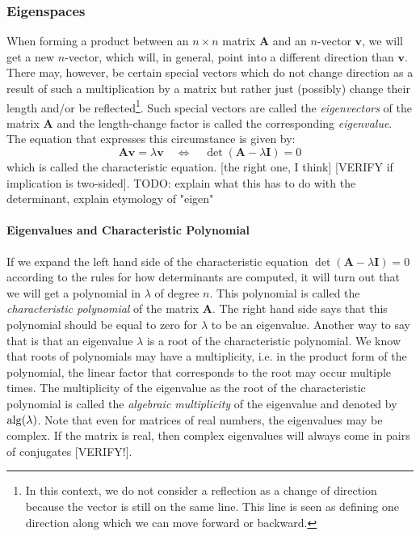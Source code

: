 \subsubsection{Eigenspaces}
When forming a product between an $n \times n$ matrix $\mathbf{A}$ and an $n$-vector $\mathbf{v}$, we will get a new $n$-vector, which will, in general, point into a different direction than  $\mathbf{v}$. There may, however, be certain special vectors which do not change direction as a result of such a multiplication by a matrix but rather just (possibly) change their length and/or be reflected\footnote{In this context, we do not consider a reflection as a change of direction because the vector is still on the same line. This line is seen as defining one direction along which we can move forward or backward.}. Such special vectors are called the \emph{eigenvectors} of the matrix $\mathbf{A}$ and the length-change factor is called the corresponding \emph{eigenvalue}. The equation that expresses this circumstance is given by:
\begin{equation}
 \mathbf{A v} = \lambda \mathbf{v}  
 \quad \Leftrightarrow \quad
 \det ( \mathbf{A} - \lambda \mathbf{I} ) = 0
\end{equation}
which is called the characteristic equation. [the right one, I think]
[VERIFY if implication is two-sided]. TODO: explain what this has to do with the determinant, explain etymology of "eigen"



\paragraph{Eigenvalues and Characteristic Polynomial}
If we expand the left hand side of the characteristic equation $\det ( \mathbf{A} - \lambda \mathbf{I} ) = 0$ according to the rules for how determinants are computed, it will turn out that we will get a polynomial in $\lambda$ of degree $n$. This polynomial is called the \emph{characteristic polynomial} of the matrix  $\mathbf{A}$. The right hand side says that this polynomial should be equal to zero for $\lambda$ to be an eigenvalue. Another way to say that is that an eigenvalue $\lambda$ is a root of the characteristic polynomial. We know that roots of polynomials may have a multiplicity, i.e. in the product form of the polynomial, the linear factor that corresponds to the root may occur multiple times. The multiplicity of the eigenvalue as the root of the characteristic polynomial is called the \emph{algebraic multiplicity} of the eigenvalue and denoted by $\operatorname{alg}(\lambda)$. Note that even for matrices of real numbers, the eigenvalues may be complex. If the matrix is real, then complex eigenvalues will always come in pairs of conjugates [VERIFY!].

